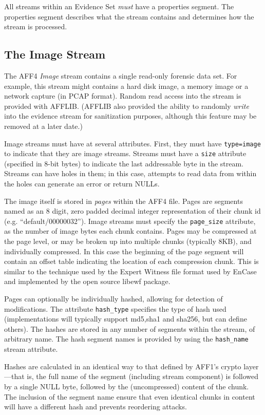 \documentclass[10pt, conference]{IEEEtran}
\begin{document}
All streams within an Evidence Set \emph{must} have a properties segment. The
properties segment describes what the stream contains and determines
how the stream is processed. 


\subsection{The Image Stream}
\label{image_stream}
The AFF4 \emph{Image} stream contains a single read-only forensic data
set. For example, this stream might contains a hard
disk image, a memory image or a network capture (in PCAP
format). Random read access into the stream is provided with
AFFLIB. (AFFLIB also provided the ability to randomly \emph{write}
into the evidence stream for sanitization purposes, although this
feature may be removed at a later date.) 

Image streams must have at several attributes. First, they must have
\texttt{type=image} to indicate that they are image streams. Streams
must have a \texttt{size} attribute (specified in 8-bit bytes) to
indicate the last addressable byte in the stream. Streams can have
holes in them; in this case, attempts to read data from within the
holes can generate an error or return NULLs.

The image itself is stored in \emph{pages} within the AFF4 file. Pages are
segments named as an 8 digit, zero padded decimal integer
representation of their chunk id (e.g. ``default/00000032''). Image
streams must specify the \texttt{page\_size} attribute, as the number of
image bytes each chunk contains. Pages may be compressed at the
page level, or may be broken up into multiple chunks (typically 8KB),
and individually compressed. In this case the beginning of the page
segment will contain an offset table indicating the location of each
compression chunk. This is similar to the technique used by the Expert
Witness file format used by EnCase\cite{encase-3.0} and implemented by
the open source libewf\cite{libewf} package.

Pages can optionally be individually hashed, allowing for detection
of modifications. The attribute \texttt{hash\_type} specifies the type of
hash used (implementations will typically support md5,sha1 and sha256, but can
define others). The hashes are stored in any number of segments within
the stream, of arbitrary name. The hash segment names is provided by
using the \texttt{hash\_name} stream attribute.

Hashes are calculated in an identical way to that defined by AFF1's
crypto layer\cite{garfinkel:affcrypto}---that is, the full name of the
segment (including stream component) is followed by a single NULL
byte, followed by the (uncompressed) content of the chunk. The
inclusion of the segment name ensure that even identical chunks in
content will have a different hash and prevents reordering attacks.
\end{document}
